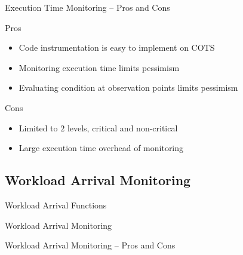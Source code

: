 \begin{frame}{Execution Time Monitoring -- Pros and Cons}

\begin{block}{Pros}
\begin{itemize}
    \item<2-> Code instrumentation is easy to implement on COTS
    \item<3-> Monitoring execution time limits pessimism
    \item<4-> Evaluating condition at observation points limits pessimism
\end{itemize}
\end{block}

\vfill

\begin{block}{Cons}
\begin{itemize}
    \item<5-> Limited to $2$ levels, critical and non-critical
    \item<6-> Large execution time overhead of monitoring
\end{itemize}
\end{block}

\end{frame}


\subsection{Workload Arrival Monitoring}

\begin{frame}{Workload Arrival Functions}

\end{frame}

\begin{frame}{Workload Arrival Monitoring}

\end{frame}


\begin{frame}{Workload Arrival Monitoring -- Pros and Cons}

\end{frame}


